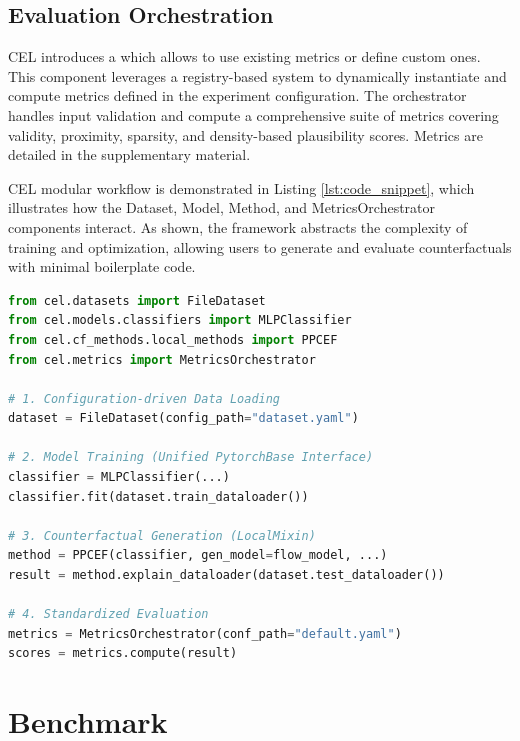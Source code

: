 \documentclass[runningheads]{llncs}
\newcommand{\code}[1]{\Colorbox{lightblue}{\lstinline{#1}}}
\begin{document}
\subsection{Evaluation Orchestration}

CEL introduces a \code{MetricsOrchestrator} which allows to use existing metrics or define custom ones. This component leverages a registry-based system to dynamically instantiate and compute metrics defined in the experiment configuration. The orchestrator handles input validation and compute a comprehensive suite of metrics covering validity, proximity, sparsity, and density-based plausibility scores. Metrics are detailed in the supplementary material.

\vspace{1em}

CEL modular workflow is demonstrated in Listing \ref{lst:code_snippet}, which illustrates how the Dataset, Model, Method, and MetricsOrchestrator components interact. As shown, the framework abstracts the complexity of training and optimization, allowing users to generate and evaluate counterfactuals with minimal boilerplate code.


\begin{lstlisting}[float=tp, belowskip=-1em, language=Python, backgroundcolor=\color{lightblue}, caption={Code snippet showing CEL modular workflow.}, label={lst:code_snippet}]
from cel.datasets import FileDataset
from cel.models.classifiers import MLPClassifier
from cel.cf_methods.local_methods import PPCEF
from cel.metrics import MetricsOrchestrator

# 1. Configuration-driven Data Loading
dataset = FileDataset(config_path="dataset.yaml")

# 2. Model Training (Unified PytorchBase Interface)
classifier = MLPClassifier(...)
classifier.fit(dataset.train_dataloader())

# 3. Counterfactual Generation (LocalMixin)
method = PPCEF(classifier, gen_model=flow_model, ...)
result = method.explain_dataloader(dataset.test_dataloader())

# 4. Standardized Evaluation
metrics = MetricsOrchestrator(conf_path="default.yaml")
scores = metrics.compute(result)
\end{lstlisting}


\section{Benchmark}
\end{document}
